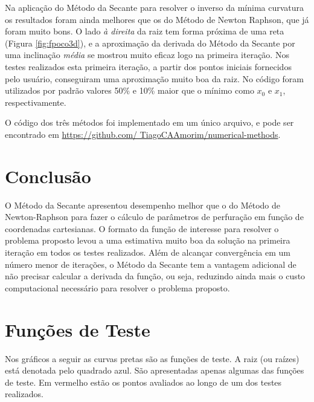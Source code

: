 \documentclass[final,5p]{elsarticle}
\numberwithin{equation}{section}
\begin{document}
    Na aplicação do Método da Secante para resolver o inverso da mínima curvatura os resultados foram ainda melhores que os do Método de Newton Raphson, que já foram muito bons. O lado \emph{à direita} da raiz tem forma próxima de uma reta (Figura \ref{fig:fpoco3d}), e a aproximação da derivada do Método da Secante por uma inclinação \emph{média} se mostrou muito eficaz logo na primeira iteração. Nos testes realizados esta primeira iteração, a partir dos pontos iniciais fornecidos pelo usuário, conseguiram uma aproximação muito boa da raiz.
    No código foram utilizados por padrão valores 50\% e 10\% maior que o mínimo como $x_0$ e $x_1$, respectivamente.

    O código dos três métodos foi implementado em um único arquivo, e pode ser encontrado em \href{https://github.com/TiagoCAAmorim/numerical-methods/blob/main/03_Secant/03_secant.c}{https://github.com/ TiagoCAAmorim/numerical-methods}.

    \section{Conclusão}

    O Método da Secante apresentou desempenho melhor que o do Método de Newton-Raphson para fazer o cálculo de parâmetros de perfuração em função de coordenadas cartesianas. O formato da função de interesse para resolver o problema proposto levou a uma estimativa muito boa da solução na primeira iteração em todos os testes realizados. Além de alcançar convergência em um número menor de iterações, o Método da Secante tem a vantagem adicional de não precisar calcular a derivada da função, ou seja, reduzindo ainda mais o custo computacional necessário para resolver o problema proposto.



\appendix

\section{Funções de Teste}

Nos gráficos a seguir as curvas pretas são as funções de teste. A raiz (ou raízes) está denotada pelo quadrado azul. São apresentadas apenas algumas das funções de teste. Em vermelho estão os pontos avaliados ao longo de um dos testes realizados.
\end{document}
